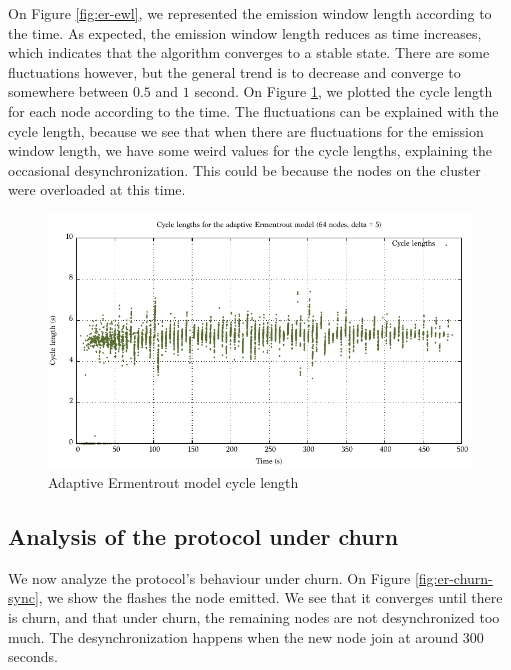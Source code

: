 \documentclass[a4paper, 11pt]{article}
\theoremstyle{plain}
\theoremstyle{definition}
\begin{document}
     On Figure \ref{fig:er-ewl}, we represented the emission window length according to the time. As expected,
     the emission window length reduces as time increases, which indicates that the algorithm converges to a
     stable state. There are some fluctuations however, but the general trend is to decrease and converge to
     somewhere between $0.5$ and $1$ second. On Figure \ref{fig:er-cl}, we plotted the cycle length for each
     node according to the time. The fluctuations can be explained with the cycle length, because we see that
     when there are fluctuations for the emission window length, we have some weird values for the cycle
     lengths, explaining the occasional desynchronization. This could be because the nodes on the cluster were
     overloaded at this time.

     \begin{figure}[h]
       \centering
       \includegraphics[width=\textwidth]{../Plots/Firefly-er-64nodes-d5-2-cl.pdf}
       \caption{Adaptive Ermentrout model cycle length}
       \label{fig:er-cl}
     \end{figure}


   \subsection{Analysis of the protocol under churn}
   \label{sec:analys-prot-under-churn}

     We now analyze the protocol's behaviour under churn. On Figure \ref{fig:er-churn-sync}, we show the
     flashes the node emitted. We see that it converges until there is churn, and that under churn, the
     remaining nodes are not desynchronized too much. The desynchronization happens when the new node join at
     around 300 seconds.
\end{document}
